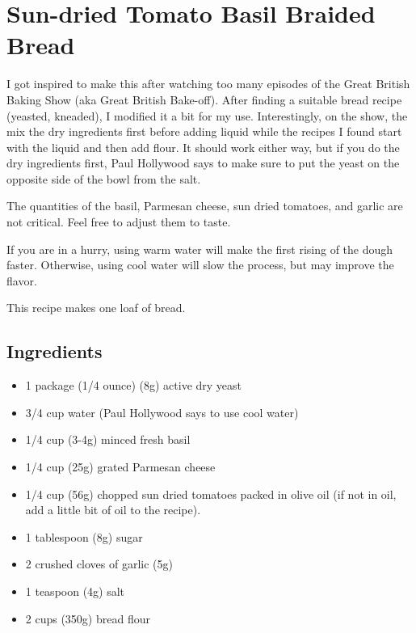 \documentclass[10pt, openany]{book}
\begin{document}
\section{Sun-dried Tomato Basil Braided Bread}
\label{bread:SubdriedTomatoBasil}
I got inspired to make this after watching too many episodes of the Great British Baking Show (aka Great British Bake-off).  After finding a suitable bread recipe (yeasted, kneaded), I modified it a bit for my use.  Interestingly, on the show, the mix the dry ingredients first before adding liquid while the recipes I found start with the liquid and then add flour.  It should work either way, but if you do the dry ingredients first, Paul Hollywood says to make sure to put the yeast on the opposite side of the bowl from the salt.

The quantities of the basil, Parmesan cheese, sun dried tomatoes, and garlic are not critical.  Feel free to adjust them to taste.

If you are in a hurry, using warm water will make the first rising of the dough faster.  Otherwise, using cool water will slow the process, but may improve the flavor.

This recipe makes one loaf of bread.

\subsection{Ingredients}
\begin{itemize}
  \item 1 package (1/4 ounce) (8g) active dry yeast
  \item 3/4 cup water (Paul Hollywood says to use cool water)
  \item 1/4 cup (3-4g) minced fresh basil
  \item 1/4 cup (25g) grated Parmesan cheese
  \item 1/4 cup (56g) chopped sun dried tomatoes packed in olive oil (if not in oil, add a little bit of oil to the recipe).
  \item 1 tablespoon (8g) sugar
  \item 2 crushed cloves of garlic (5g)
  \item 1 teaspoon (4g) salt
  \item 2 cups (350g) bread flour
\end{itemize}
\end{document}
